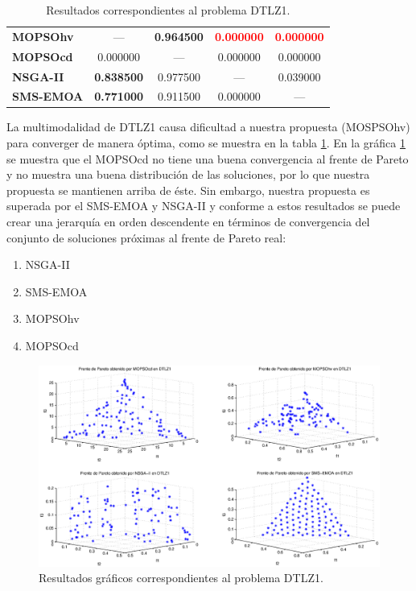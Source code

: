 \begin{table}
\begin{center}
\begin{tabular}{|l|cc|cc|}
	\textbf{MOPSOhv} & ---      & \textbf{0.964500} &  \textbf{\textcolor{red}{0.000000}} &  \textbf{\textcolor{red}{0.000000}}  \\ 
	\textbf{MOPSOcd} & 0.000000 & ---      &  0.000000  & 0.000000 \\ 
	\textbf{NSGA-II} & \textbf{0.838500} & 0.977500 & ---       & 0.039000 \\  
	\textbf{SMS-EMOA}& \textbf{0.771000} & 0.911500 & 0.000000  & --- \\  
	\hline
	\end{tabular}
\caption{Resultados correspondientes al problema DTLZ1.}
  \label{tab:dtlz1}
\end{center}
\end{table}
La multimodalidad de DTLZ1 causa dificultad a nuestra propuesta (MOSPSOhv) para converger de manera \'optima, como se muestra en la 
tabla \ref{tab:dtlz1}. En la gr\'afica \ref{fig:rDTLZ1} se muestra que el MOPSOcd no tiene una buena convergencia
al frente de Pareto y no muestra una buena distribuci\'on de las soluciones, por lo que nuestra propuesta se mantienen arriba de \'este.
Sin embargo, nuestra propuesta es superada por el SMS-EMOA y NSGA-II y conforme a estos resultados se puede crear una
jerarqu\'ia en orden descendente en t\'erminos de convergencia del conjunto de soluciones pr\'oximas al frente de Pareto real:

\begin{enumerate}
  \item NSGA-II
  \item SMS-EMOA
  \item MOPSOhv
  \item MOPSOcd
\end{enumerate}

\clearpage
\newpage

\begin{figure}
      \begin{center}
	  \includegraphics[scale=0.45]{Cap4/rdtlz1r.eps}
      \end{center}
	\caption{Resultados gr\'aficos correspondientes al problema DTLZ1.}
      \label{fig:rDTLZ1}
\end{figure}

